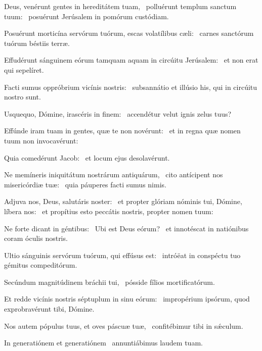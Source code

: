 \item Deus, venérunt gentes in hereditátem tuam,~\pscross{} polluérunt templum sanctum tuum:~\psstar{} posuérunt Jerúsalem in pomórum custódiam.

\item Posuérunt morticína servórum tuórum, escas volatílibus cæli:~\psstar{} carnes sanctórum tuórum béstiis terræ.

\item Effudérunt sánguinem eórum tamquam aquam in circúitu Jerúsalem:~\psstar{} et non erat qui sepelíret.

\item Facti sumus oppróbrium vicínis nostris:~\psstar{} subsannátio et illúsio his, qui in circúitu nostro sunt.

\item Usquequo, Dómine, irascéris in finem:~\psstar{} accendétur velut ignis zelus tuus?

\item Effúnde iram tuam in gentes, quæ te non novérunt:~\psstar{} et in regna quæ nomen tuum non invocavérunt:

\item Quia comedérunt Jacob:~\psstar{} et locum ejus desolavérunt.

\item Ne memíneris iniquitátum nostrárum antiquárum,~\pscross{} cito antícipent nos misericórdiæ tuæ:~\psstar{} quia páuperes facti sumus nimis.

\item Adjuva nos, Deus, salutáris noster:~\pscross{} et propter glóriam nóminis tui, Dómine, líbera nos:~\psstar{} et propítius esto peccátis nostris, propter nomen tuum:

\item Ne forte dicant in géntibus:~\pscross{} Ubi est Deus eórum?~\psstar{} et innotéscat in natiónibus coram óculis nostris.

\item Ultio sánguinis servórum tuórum, qui effúsus est:~\psstar{} intróëat in conspéctu tuo gémitus compeditórum.

\item Secúndum magnitúdinem bráchii tui,~\psstar{} pósside fílios mortificatórum.

\item Et redde vicínis nostris séptuplum in sinu eórum:~\psstar{} impropérium ipsórum, quod exprobravérunt tibi, Dómine.

\item Nos autem pópulus tuus, et oves páscuæ tuæ,~\psstar{} confitébimur tibi in sǽculum.

\item In generatiónem et generatiónem~\psstar{} annuntiábimus laudem tuam.